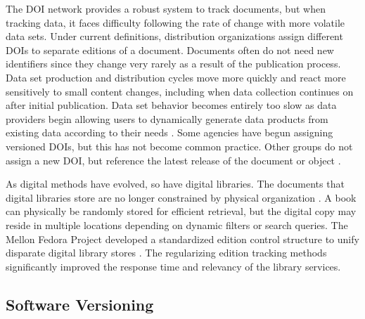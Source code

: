 The DOI network provides a robust system to track documents, but when tracking data, it faces difficulty following the rate of change with more volatile data sets.
Under current definitions, distribution organizations assign different DOIs to separate editions of a document.
Documents often do not need new identifiers since they change very rarely as a result of the publication process.
Data set production and distribution cycles move more quickly and react more sensitively to small content changes, including when data collection continues on after initial publication.
Data set behavior becomes entirely too slow as data providers begin allowing users to dynamically generate data products from existing data according to their needs \cite{Barkstrom2003a}.
Some agencies have begun assigning versioned DOIs, but this has not become common practice.
Other groups do not assign a new DOI, but reference the latest release of the document or object \cite{Ands2017}.

As digital methods have evolved, so have digital libraries.
The documents that digital libraries store are no longer constrained by physical organization \cite{Barkstrom_digitallibrary}.
A book can physically be randomly stored for efficient retrieval, but the digital copy may reside in multiple locations depending on dynamic filters or search queries.
The Mellon Fedora Project developed a standardized edition control structure to unify disparate digital library stores \cite{Payette2002}.
The regularizing edition tracking methods significantly improved the response time and relevancy of the library services.

\subsection{Software Versioning}

